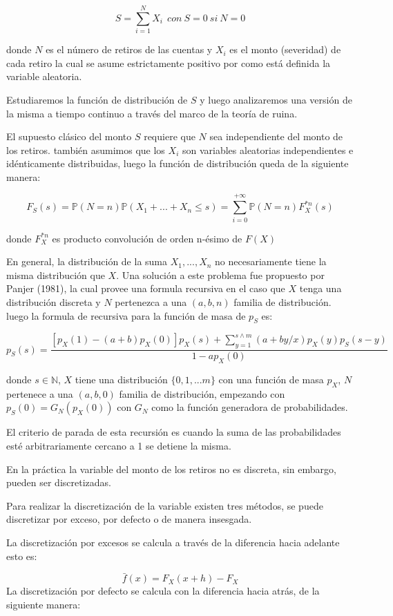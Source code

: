 \documentclass[]{article}
\begin{document}
\[S=\sum_{i=1}^{N}X_i~~con~S=0 ~si~N=0\]

donde \(N\) es el número de retiros de las cuentas y \(X_i\) es el monto
(severidad) de cada retiro la cual se asume estrictamente positivo por
como está definida la variable aleatoria.

Estudiaremos la función de distribución de \(S\) y luego analizaremos
una versión de la misma a tiempo continuo a través del marco de la
teoría de ruina.

El supuesto clásico del monto \(S\) requiere que \(N\) sea independiente
del monto de los retiros. también asumimos que los \(X_i\) son variables
aleatorias independientes e idénticamente distribuidas, luego la función
de distribución queda de la siguiente manera:

\[F_{S}(s)=\mathbb{P}(N=n)\mathbb{P}(X_1+...+X_n\leq s)=\sum_{i=0}^{+\infty}\mathbb{P}(N=n)F_{X}^{*n}(s)\]

donde \(F_{X}^{*n}\) es producto convolución de orden n-ésimo de
\(F(X)\)

En general, la distribución de la suma \(X_1, ..., X_n\) no
necesariamente tiene la misma distribución que \(X\). Una solución a
este problema fue propuesto por Panjer (1981), la cual provee una
formula recursiva en el caso que \(X\) tenga una distribución discreta y
\(N\) pertenezca a una \((a,b,n)\) familia de distribución. luego la
formula de recursiva para la función de masa de \(p_S\) es:

\[p_S(s)=\frac{[p_X(1)-(a+b)p_X(0)]p_X(s)+\sum_{y=1}^{s\wedge m}(a+by/x)p_X(y)p_S(s-y)}{1-ap_X(0)}\]

donde \(s \in \mathbb{N}\), \(X\) tiene una distribución
\(\{0,1,...m\}\) con una función de masa \(p_X\), \(N\) pertenece a una
\((a,b,0)\) familia de distribución, empezando con
\(p_S(0)=G_N(p_X(0))\) con \(G_N\) como la función generadora de
probabilidades.

El criterio de parada de esta recursión es cuando la suma de las
probabilidades esté arbitrariamente cercano a 1 se detiene la misma.

En la práctica la variable del monto de los retiros no es discreta, sin
embargo, pueden ser discretizadas.

Para realizar la discretización de la variable existen tres métodos, se
puede discretizar por exceso, por defecto o de manera insesgada.

La discretización por excesos se calcula a través de la diferencia hacia
adelante esto es:

\[\bar{f}(x)=F_X(x+h)-F_X\] La discretización por defecto se calcula con
la diferencia hacia atrás, de la siguiente manera:
\end{document}
